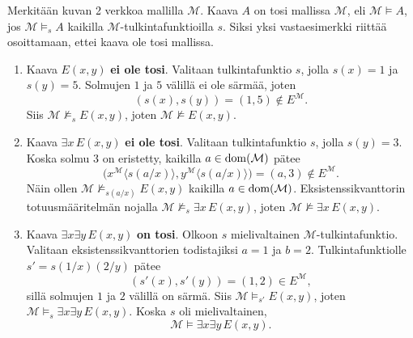 \documentclass[11pt,a4paper]{amsart}
\begin{document}
\begin{solution}
  Merkitään kuvan 2 verkkoa mallilla \(\mathcal M\). Kaava \(A\) on
  tosi mallissa \(\mathcal M\), eli \(\mathcal M\models A\), jos
  \(\mathcal M\models_s A\) kaikilla \(\mathcal M\)-tulkintafunktioilla
  \(s\). Siksi yksi vastaesimerkki riittää osoittamaan, ettei kaava ole
  tosi mallissa.
  \leavevmode\par
  \begin{enumerate}[label=(\alph*)]
    \item Kaava \(E(x,y)\) \textbf{ei ole tosi}. Valitaan
      tulkintafunktio \(s\), jolla \(s(x)=1\) ja \(s(y)=5\).
      Solmujen \(1\) ja \(5\) välillä ei ole särmää, joten
      \[
        (s(x),s(y))=(1,5)\notin E^{\mathcal M}.
      \]
      Siis \(\mathcal M\not\models_s E(x,y)\), joten
      \(\mathcal M\not\models E(x,y)\).

    \item Kaava \(\exists x\,E(x,y)\) \textbf{ei ole tosi}.
      Valitaan tulkintafunktio \(s\), jolla \(s(y)=3\).
      Koska solmu \(3\) on eristetty, kaikilla
      \(a\in\operatorname{dom}(\mathcal M)\) pätee
      \[
        \bigl(x^{\mathcal M}\langle s(a/x)\rangle,
        y^{\mathcal M}\langle s(a/x)\rangle\bigr)
        =(a,3)\notin E^{\mathcal M}.
      \]
      Näin ollen \(\mathcal M\not\models_{s(a/x)} E(x,y)\)
      kaikilla \(a\in\operatorname{dom}(\mathcal M)\). Eksistenssikvanttorin
      totuusmääritelmän nojalla
      \(\mathcal M\not\models_s\exists x\,E(x,y)\), joten
      \(\mathcal M\not\models\exists x\,E(x,y)\).

    \item Kaava \(\exists x\exists y\,E(x,y)\) \textbf{on tosi}.
      Olkoon \(s\) mielivaltainen \(\mathcal M\)-tulkintafunktio.
      Valitaan eksistenssikvanttorien todistajiksi \(a=1\) ja \(b=2\).
      Tulkintafunktiolle \(s'=s(1/x)(2/y)\) pätee
      \[
        (s'(x),s'(y))=(1,2)\in E^{\mathcal M},
      \]
      sillä solmujen \(1\) ja \(2\) välillä on särmä. Siis
      \(\mathcal M\models_{s'}E(x,y)\), joten
      \(\mathcal M\models_s\exists x\exists y\,E(x,y)\).
      Koska \(s\) oli mielivaltainen,
      \[
        \mathcal M\models\exists x\exists y\,E(x,y).
      \]


\end{enumerate}
\end{solution}
\end{document}

